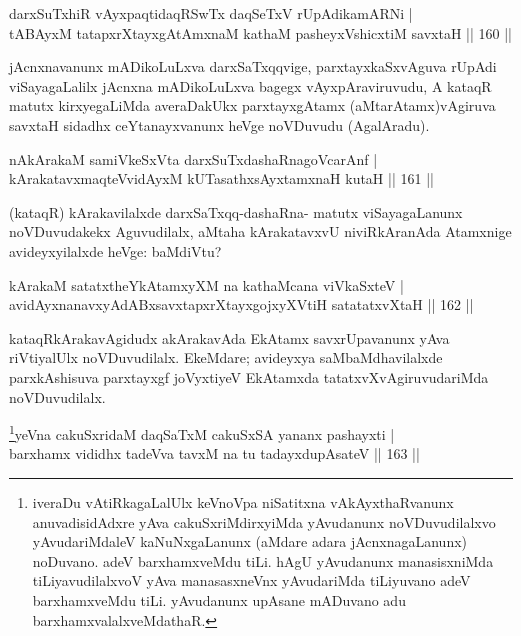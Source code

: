 \begin{shl}
darxSuTxhiR vAyxpaqtidaqRSwTx daqSeTxV rUpAdikamARNi |\\
tABAyxM tatapxrXtayxgAtAmxnaM kathaM pasheyxVshicxtiM savxtaH \hfill || 160 ||
\end{shl}

\begin{artha}
jAcnxnavanunx mADikoLuLxva darxSaTxqqvige, parxtayxkaSxvAguva rUpAdi viSayagaLalilx jAcnxna mADikoLuLxva bagegx vAyxpAraviruvudu, A kataqR matutx kirxyegaLiMda averaDakUkx parxtayxgAtamx (aMtarAtamx)vAgiruva savxtaH sidadhx ceYtanayxvanunx heVge noVDuvudu (AgalAradu).
\end{artha}

\begin{shl}
nAkArakaM samiVkeSxVta darxSuTxdashaRnagoVcarAnf |\\
kArakatavxmaqteV\s vidAyxM kUTasathxsAyx\s \s tamxnaH kutaH \hfill || 161 ||
\end{shl}

\begin{artha}
(kataqR) kArakavilalxde darxSaTxqq-dashaRna- matutx viSayagaLanunx noVDuvudakekx Aguvudilalx, aMtaha kArakatavxvU niviRkAranAda Atamxnige avideyxyilalxde heVge: baMdiVtu?
\end{artha}

\begin{shl}
kArakaM satatxtheYkAtamxyXM na kathaMcana viVkaSxteV |\\
avidAyxnanavxyAdABxsavxtapxrXtayxgojxyXVtiH satatatxvXtaH \hfill || 162 ||
\end{shl}

\begin{artha}
kataqRkArakavAgidudx akArakavAda EkAtamx savxrUpavanunx yAva riVtiyalUlx noVDuvudilalx. EkeMdare; avideyxya saMbaMdhavilalxde parxkAshisuva parxtayxgf joVyxtiyeV EkAtamxda tatatxvXvAgiruvudariMda noVDuvudilalx.
\end{artha}


\begin{shl}
\footnote{iveraDu vAtiRkagaLalUlx keVnoVpa niSatitxna vAkAyxthaRvanunx anuvadisidAdxre yAva cakuSxriMdirxyiMda yAvudanunx noVDuvudilalxvo yAvudariMdaleV kaNuNxgaLanunx (aMdare adara jAcnxnagaLanunx) noDuvano. adeV barxhamxveMdu tiLi. hAgU yAvudanunx manasisxniMda tiLiyavudilalxvoV yAva manasasxneVnx yAvudariMda tiLiyuvano adeV barxhamxveMdu tiLi. yAvudanunx upAsane mADuvano adu barxhamxvalalxveMdathaR.}yeVna cakuSxridaM daqSaTxM cakuSxSA yananx pashayxti |\\
barxhamx vididhx tadeVva tavxM na tu tadayxdupAsateV \hfill || 163 ||
\end{shl}


